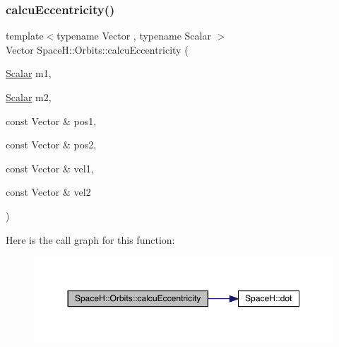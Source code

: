 \subsubsection{\texorpdfstring{calcu\+Eccentricity()}{calcuEccentricity()}}
{\footnotesize\ttfamily template$<$typename Vector , typename Scalar $>$ \\
Vector Space\+H\+::\+Orbits\+::calcu\+Eccentricity (\begin{DoxyParamCaption}\item[{\mbox{\hyperlink{create_kepler_8cpp_a8c2981f3f834be9448a6ab06c28748eb}{Scalar}}}]{m1,  }\item[{\mbox{\hyperlink{create_kepler_8cpp_a8c2981f3f834be9448a6ab06c28748eb}{Scalar}}}]{m2,  }\item[{const Vector \&}]{pos1,  }\item[{const Vector \&}]{pos2,  }\item[{const Vector \&}]{vel1,  }\item[{const Vector \&}]{vel2 }\end{DoxyParamCaption})\hspace{0.3cm}{\ttfamily [inline]}}

Here is the call graph for this function\+:
\nopagebreak
\begin{figure}[H]
\begin{center}
\leavevmode
\includegraphics[width=350pt]{namespace_space_h_1_1_orbits_a67c6c20142cd8a4bd9690741c61314da_cgraph}
\end{center}
\end{figure}
\mbox{\label{namespace_space_h_1_1_orbits_ad5dd14dac8365a426bc0ff7452318835}} 
